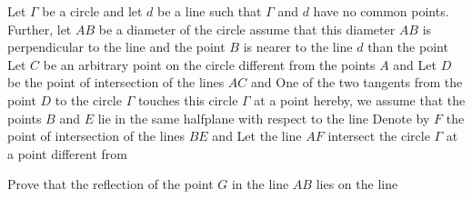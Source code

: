 Let $\Gamma$ be a circle and let $d$ be a line such that $\Gamma$ and $d$ have no common points. Further, let $AB$ be a diameter of the circle  assume that this diameter $AB$ is perpendicular to the line  and the point $B$ is nearer to the line $d$ than the point  Let $C$ be an arbitrary point on the circle  different from the points $A$ and  Let $D$ be the point of intersection of the lines $AC$ and  One of the two tangents from the point $D$ to the circle $\Gamma$ touches this circle $\Gamma$ at a point  hereby, we assume that the points $B$ and $E$ lie in the same halfplane with respect to the line  Denote by $F$ the point of intersection of the lines $BE$ and  Let the line $AF$ intersect the circle $\Gamma$ at a point  different from 

Prove that the reflection of the point $G$ in the line $AB$ lies on the line 
